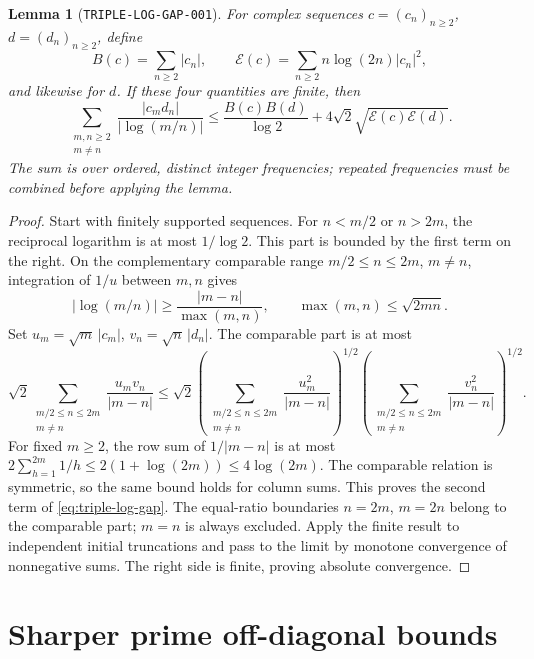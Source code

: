 \documentclass[11pt]{article}
\newtheorem{lemma}{Lemma}
\begin{document}
\begin{lemma}[\texttt{TRIPLE-LOG-GAP-001}]\label{lem:triple-log-gap}
For complex sequences \(c=(c_n)_{n\geq2}\), \(d=(d_n)_{n\geq2}\), define
\[
 B(c)=\sum_{n\geq2}|c_n|,\qquad
 \mathcal E(c)=\sum_{n\geq2}n\log(2n)|c_n|^2,
\]
and likewise for \(d\). If these four quantities are finite, then
\begin{equation}\label{eq:triple-log-gap}
 \sum_{\substack{m,n\geq2\\m\ne n}}
 \frac{|c_md_n|}{|\log(m/n)|}
 \leq\frac{B(c)B(d)}{\log2}
       +4\sqrt2\sqrt{\mathcal E(c)\mathcal E(d)}.
\end{equation}
The sum is over ordered, distinct integer frequencies; repeated
frequencies must be combined before applying the lemma.
\end{lemma}
\begin{proof}
Start with finitely supported sequences. For
\(n<m/2\) or \(n>2m\), the reciprocal logarithm is at most \(1/\log2\).
This part is bounded by the first term on the right.
On the complementary comparable range \(m/2\leq n\leq2m\), \(m\ne n\),
integration of \(1/u\) between \(m,n\) gives
\[
 |\log(m/n)|\geq\frac{|m-n|}{\max(m,n)},\qquad
 \max(m,n)\leq\sqrt{2mn}.
\]
Set \(u_m=\sqrt m\,|c_m|\), \(v_n=\sqrt n\,|d_n|\).
The comparable part is at most
\[
 \sqrt2\sum_{\substack{m/2\leq n\leq2m\\m\ne n}}\frac{u_mv_n}{|m-n|}
 \leq\sqrt2
 \left(\sum_{\substack{m/2\leq n\leq2m\\m\ne n}}\frac{u_m^2}{|m-n|}\right)^{1/2}
 \left(\sum_{\substack{m/2\leq n\leq2m\\m\ne n}}\frac{v_n^2}{|m-n|}\right)^{1/2}.
\]
For fixed \(m\geq2\), the row sum of \(1/|m-n|\) is at most
\(2\sum_{h=1}^{2m}1/h\leq2(1+\log(2m))\leq4\log(2m)\).
The comparable relation is symmetric, so the same bound holds for
column sums. This proves the second term of \eqref{eq:triple-log-gap}.
The equal-ratio boundaries \(n=2m\), \(m=2n\) belong to the comparable
part; \(m=n\) is always excluded. Apply the finite result to independent
initial truncations and pass to the limit by monotone convergence of
nonnegative sums. The right side is finite, proving absolute convergence.
\end{proof}

\section{Sharper prime off-diagonal bounds}
\end{document}
